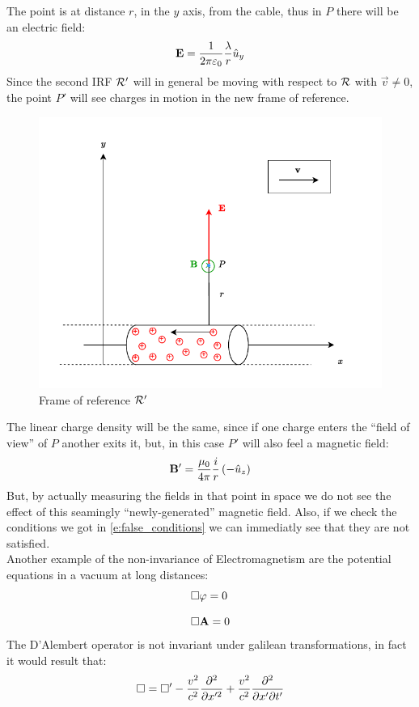 The point is at distance $r$, in the $y$ axis, from the cable, thus in $P$ there will be an electric field:
\begin{equation}
  \vb{E} = \dfrac{1}{2 \pi \varepsilon_0}\dfrac{\lambda}{r}\hat{u}_y
\end{equation}
Since the second IRF $\mathcal{R'}$ will in general be moving with respect to $\mathcal{R}$ with $\vec{v} \neq 0$, the point $P'$ will see charges in motion in the new frame of reference.
\begin{figure}[H]
  \centering
  \includegraphics[width=0.6\linewidth]{res/svg/moving_cable.drawio}
  \caption{Frame of reference $\mathcal{R'}$}
\end{figure}
The linear charge density will be the same, since if one charge enters the ``field of view'' of $P$ another exits it, but, in this case $P'$ will also feel a magnetic field:
\begin{equation}
  \vb{B}' = \dfrac{\mu_0}{4 \pi}\dfrac{i}{r}\left(-\hat{u}_z\right)
\end{equation}
But, by actually measuring the fields in that point in space we do not see the effect of this seamingly ``newly-generated'' magnetic field. Also, if we check the conditions we got in \eqref{e:false_conditions} we can immediatly see that they are not satisfied.\\
Another example of the non-invariance of Electromagnetism are the potential equations in a vacuum at long distances:
\begin{equation}
  \begin{split}
    &\square \varphi = 0\\[8pt]
    &\square \vb{A} = 0
  \end{split}
\end{equation}
The D'Alembert operator is not invariant under galilean transformations, in fact it would result that:
\begin{equation}
  \dalop = \dalop' -\dfrac{v^2}{c^2} \dfrac{\partial^2}{\partial x'^2} + \dfrac{v^2}{c^2} \pdv{}{x'}{t'}
\end{equation}

